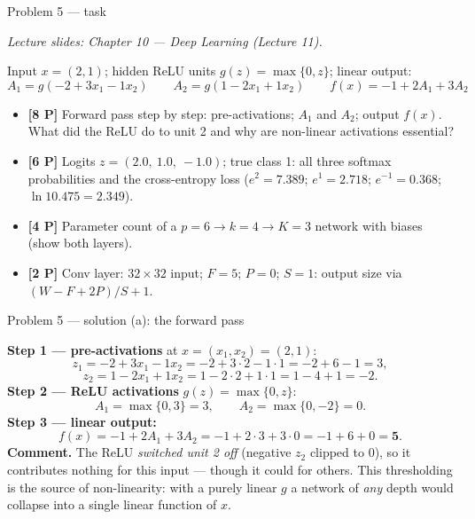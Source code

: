 \documentclass[aspectratio=169,11pt]{beamer}
\begin{document}
\begin{frame}{Problem 5 --- task}
  \begin{exercise}
    {\scriptsize\itshape Lecture slides: Chapter 10 --- Deep Learning (Lecture 11).}\par\smallskip
    Input $x=(2{,}1)$; hidden ReLU units $g(z)=\max\{0{,}z\}$; linear output:
    \[
      A_1=g(-2+3x_1-1x_2)\qquad A_2=g(1-2x_1+1x_2)\qquad f(x)=-1+2A_1+3A_2
    \]
    \begin{itemize}
      \item[(a)] \textbf{[8 P]} Forward pass step by step: pre-activations; $A_1$ and $A_2$;
        output $f(x)$. What did the ReLU do to unit 2 and why are non-linear activations essential?
      \item[(b)] \textbf{[6 P]} Logits $z=(2.0{,}\ 1.0{,}\ -1.0)$; true class 1: all three softmax
        probabilities and the cross-entropy loss
        ($e^{2}=7.389$; $e^{1}=2.718$; $e^{-1}=0.368$; $\ln 10.475=2.349$).
      \item[(c)] \textbf{[4 P]} Parameter count of a $p=6\to k=4\to K=3$ network with biases
        (show both layers).
      \item[(d)] \textbf{[2 P]} Conv layer: $32\times 32$ input; $F=5$; $P=0$; $S=1$:
        output size via $(W-F+2P)/S+1$.
    \end{itemize}
  \end{exercise}
\end{frame}

\begin{frame}{Problem 5 --- solution (a): the forward pass}
  \begin{solutionbox}
    \textbf{Step 1 --- pre-activations} at $x=(x_1,x_2)=(2,1)$:
    \[
      z_1=-2+3x_1-1x_2=-2+3\cdot2-1\cdot1=-2+6-1=3,
    \]
    \[
      z_2=1-2x_1+1x_2=1-2\cdot2+1\cdot1=1-4+1=-2.
    \]
    \textbf{Step 2 --- ReLU activations} $g(z)=\max\{0,z\}$:
    \[
      A_1=\max\{0,3\}=3,\qquad A_2=\max\{0,-2\}=0.
    \]
    \textbf{Step 3 --- linear output:}
    \[
      f(x)=-1+2A_1+3A_2=-1+2\cdot3+3\cdot0=-1+6+0=\mathbf{5}.
    \]
    \textbf{Comment.} The ReLU \emph{switched unit 2 off} (negative $z_2$ clipped to $0$), so it
    contributes nothing for this input --- though it could for others. This thresholding is the
    source of non-linearity: with a purely linear $g$ a network of \emph{any} depth would collapse
    into a single linear function of $x$.
  \end{solutionbox}
\end{frame}
\end{document}
